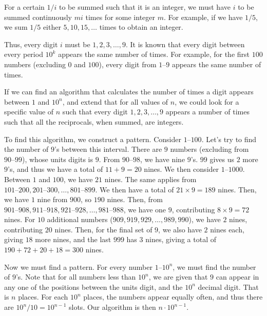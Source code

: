 \begin{enumerate}
 For a certain \( 1/i \) to be summed such that it is an integer, we must have \( i \) to be summed continuously \( mi \) times for some integer \( m \). For example, if we have \( 1/5 \), we sum \( 1/5 \) either \( 5, 10, 15, \dots \) times to obtain an integer.

 Thus, every digit \( i \) must be \( 1, 2, 3, \dots, 9 \). It is known that every digit between every period \( 10^k \) appears the same number of times. For example, for the first \( 100 \) numbers (excluding \( 0 \) and \( 100 \)), every digit from \( 1 \text{--} 9 \) appears the same number of times.

 If we can find an algorithm that calculates the number of times a digit appears between \( 1 \) and \( 10^n \), and extend that for all values of \( n \), we could look for a specific value of \( n \) such that every digit \( 1, 2, 3, \dots, 9 \) appears a number of times such that all the reciprocals, when summed, are integers.

 To find this algorithm, we construct a pattern. Consider \( 1 \text{--} 100 \). Let's try to find the number of \( 9 \)'s between this interval. There are \( 9 \) numbers (excluding from \( 90 \text{--} 99 \)), whose units digits is \( 9 \). From \( 90 \text{--} 98 \), we have nine \( 9 \)'s. \( 99 \) gives us \( 2 \) more \( 9 \)'s, and thus we have a total of \( 11 + 9 = 20 \) nines. We then consider \( 1 \text{--} 1000 \). Between \( 1 \) and \( 100 \), we have \( 21 \) nines. The same applies from \( 101 \text{--} 200, 201 \text{--} 300, \dots, 801 \text{--} 899 \). We then have a total of \( 21 \times 9 = 189 \) nines. Then, we have \( 1 \) nine from \( 900 \), so \( 190 \) nines. Then, from \( 901 \text{--} 908, 911 \text{--} 918, 921 \text{--} 928, \dots, 981 \text{--} 988 \), we have one \( 9 \), contributing \( 8 \times 9 = 72 \) nines. For \( 10 \) additional numbers (\( 909, 919, 929, \dots, 989, 990 \)), we have \( 2 \) nines, contributing \( 20 \) nines. Then, for the final set of \( 9 \), we also have \( 2 \) nines each, giving \( 18 \) more nines, and the last \( 999 \) has \( 3 \) nines, giving a total of \( 190 + 72 + 20 + 18 = 300 \) nines.

 Now we must find a pattern. For every number \( 1 \text{--} 10^n \), we must find the number of \( 9 \)'s. Note that for all numbers less than \( 10^n \), we are given that \( 9 \) can appear in any one of the positions between the units digit, and the \( 10^n \) decimal digit. That is \( n \) places. For each \( 10^n \) places, the numbers appear equally often, and thus there are \( 10^n / 10 = 10^{n-1} \) slots. Our algorithm is then \( n \cdot 10^{n-1} \). 


\end{enumerate}
